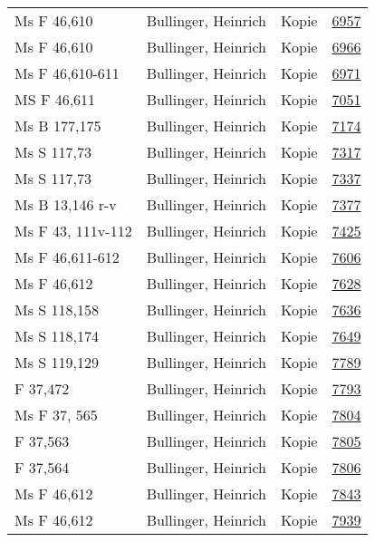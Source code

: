\documentclass[10pt,a4paper,landscape]{report}
\begin{document}
\begin{longtable}{p{16cm}p{4cm}lr}
Ms F 46,610	&	Bullinger, Heinrich	&	Kopie	&	\href{http://130.60.24.72/assignment/6957}{6957}\\
Ms F 46,610	&	Bullinger, Heinrich	&	Kopie	&	\href{http://130.60.24.72/assignment/6966}{6966}\\
Ms F 46,610-611	&	Bullinger, Heinrich	&	Kopie	&	\href{http://130.60.24.72/assignment/6971}{6971}\\
MS F 46,611	&	Bullinger, Heinrich	&	Kopie	&	\href{http://130.60.24.72/assignment/7051}{7051}\\
Ms B 177,175	&	Bullinger, Heinrich	&	Kopie	&	\href{http://130.60.24.72/assignment/7174}{7174}\\
Ms S 117,73	&	Bullinger, Heinrich	&	Kopie	&	\href{http://130.60.24.72/assignment/7317}{7317}\\
Ms S 117,73	&	Bullinger, Heinrich	&	Kopie	&	\href{http://130.60.24.72/assignment/7337}{7337}\\
Ms B 13,146 r-v	&	Bullinger, Heinrich	&	Kopie	&	\href{http://130.60.24.72/assignment/7377}{7377}\\
Ms F 43, 111v-112	&	Bullinger, Heinrich	&	Kopie	&	\href{http://130.60.24.72/assignment/7425}{7425}\\
Ms F 46,611-612	&	Bullinger, Heinrich	&	Kopie	&	\href{http://130.60.24.72/assignment/7606}{7606}\\
Ms F 46,612	&	Bullinger, Heinrich	&	Kopie	&	\href{http://130.60.24.72/assignment/7628}{7628}\\
Ms S 118,158	&	Bullinger, Heinrich	&	Kopie	&	\href{http://130.60.24.72/assignment/7636}{7636}\\
Ms S 118,174	&	Bullinger, Heinrich	&	Kopie	&	\href{http://130.60.24.72/assignment/7649}{7649}\\
Ms S 119,129	&	Bullinger, Heinrich	&	Kopie	&	\href{http://130.60.24.72/assignment/7789}{7789}\\
F 37,472	&	Bullinger, Heinrich	&	Kopie	&	\href{http://130.60.24.72/assignment/7793}{7793}\\
Ms F 37, 565	&	Bullinger, Heinrich	&	Kopie	&	\href{http://130.60.24.72/assignment/7804}{7804}\\
F 37,563	&	Bullinger, Heinrich	&	Kopie	&	\href{http://130.60.24.72/assignment/7805}{7805}\\
F 37,564	&	Bullinger, Heinrich	&	Kopie	&	\href{http://130.60.24.72/assignment/7806}{7806}\\
Ms F 46,612	&	Bullinger, Heinrich	&	Kopie	&	\href{http://130.60.24.72/assignment/7843}{7843}\\
Ms F 46,612	&	Bullinger, Heinrich	&	Kopie	&	\href{http://130.60.24.72/assignment/7939}{7939}\\

\end{longtable}
\end{document}
